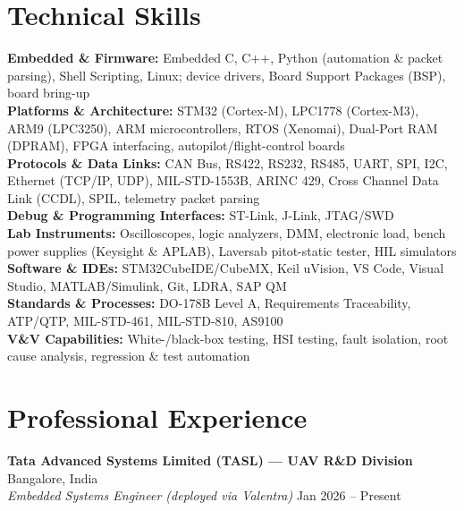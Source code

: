 \documentclass[11pt,a4paper]{article}
\begin{document}
\section*{Technical Skills}
\textbf{Embedded \& Firmware:} Embedded C, C++, Python (automation \& packet parsing), Shell Scripting, Linux; device drivers, Board Support Packages (BSP), board bring-up\\
\textbf{Platforms \& Architecture:} STM32 (Cortex-M), LPC1778 (Cortex-M3), ARM9 (LPC3250), ARM microcontrollers, RTOS (Xenomai), Dual-Port RAM (DPRAM), FPGA interfacing, autopilot/flight-control boards\\
\textbf{Protocols \& Data Links:} CAN Bus, RS422, RS232, RS485, UART, SPI, I2C, Ethernet (TCP/IP, UDP), MIL-STD-1553B, ARINC 429, Cross Channel Data Link (CCDL), SPIL, telemetry packet parsing\\
\textbf{Debug \& Programming Interfaces:} ST-Link, J-Link, JTAG/SWD\\
\textbf{Lab Instruments:} Oscilloscopes, logic analyzers, DMM, electronic load, bench power supplies (Keysight \& APLAB), Laversab pitot-static tester, HIL simulators\\
\textbf{Software \& IDEs:} STM32CubeIDE/CubeMX, Keil uVision, VS Code, Visual Studio, MATLAB/Simulink, Git, LDRA, SAP QM\\
\textbf{Standards \& Processes:} DO-178B Level A, Requirements Traceability, ATP/QTP, MIL-STD-461, MIL-STD-810, AS9100\\
\textbf{V\&V Capabilities:} White-/black-box testing, HSI testing, fault isolation, root cause analysis, regression \& test automation

\section*{Professional Experience}

\textbf{Tata Advanced Systems Limited (TASL) --- UAV R\&D Division} \hfill Bangalore, India\\
\textit{Embedded Systems Engineer (deployed via Valentra)} \hfill Jan 2026 -- Present
\end{document}
